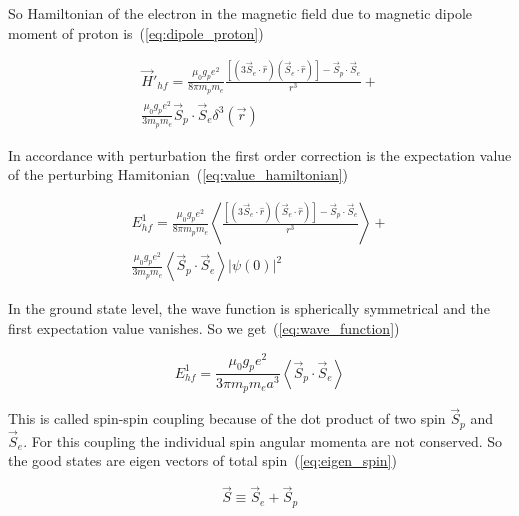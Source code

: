 \documentclass[10pt,conference]{IEEEtran}
\begin{document}
So Hamiltonian of the electron in the magnetic field due to magnetic dipole moment of proton is~(\ref{eq:dipole_proton})

\begin{equation}
\begin{split}
 \vec{H}'_{hf}=\frac{\mathit{\mu}_{0}g_{p}\mathit{e}^{2}}{8\mathit{\pi}\mathit{m}_{p}\mathit{m}_{e}}\frac{[(3\vec{S}_{e}\cdot\mathit{\hat{r}})(\vec{S}_{e}\cdot\mathit{\hat{r}})]-\vec{S}_{p}\cdot\vec{S}_{e}}{\mathit{r}^{3}}+\\\frac{\mathit{\mu}_{0}g_{p}\mathit{e}^{2}}{3\mathit{m}_{p}\mathit{m}_{e}}\vec{S}_{p}\cdot\vec{S}_{e}\delta^{3}(\vec{r})
\end{split}
 \label{eq:dipole_proton}  
\end{equation}

In accordance with perturbation the first order correction is the expectation value of the perturbing Hamitonian~(\ref{eq:value_hamiltonian})

\begin{equation}
\begin{split}
 \mathit{E}_{hf}^{1}=\frac{\mathit{\mu}_{0}g_{p}\mathit{e}^{2}}{8\mathit{\pi}\mathit{m}_{p}\mathit{m}_{e}}\left\langle\frac{[(3\vec{S}_{e}\cdot\mathit{\hat{r}})(\vec{S}_{e}\cdot\mathit{\hat{r}})]-\vec{S}_{p}\cdot\vec{S}_{e}}{\mathit{r}^{3}}\right\rangle+\\\frac{\mathit{\mu}_{0}g_{p}\mathit{e}^{2}}{3\mathit{m}_{p}\mathit{m}_{e}}\left\langle\vec{S}_{p}\cdot\vec{S}_{e}\right\rangle\vert\mathit{\psi}\left(0\right)\vert^{2}
\end{split}
 \label{eq:value_hamiltonian} 
\end{equation}

In the ground state level, the wave function is spherically symmetrical and the first expectation value vanishes. So we get~(\ref{eq:wave_function})

\begin{equation}
 \mathit{E}_{hf}^{1}=\frac{\mathit{\mu}_{0}g_{p}e^{2}}{3\pi\mathit{m}_{p}\mathit{m}_{e}\mathit{a}^{3}}\left\langle\vec{S}_{p}\cdot\vec{S}_{e}\right\rangle
 \label{eq:wave_function}
\end{equation}

This is called spin-spin coupling because of the dot product of two spin $\vec{S}_{p}$ and $\vec{S}_{e}$. For this coupling the individual spin angular momenta are not conserved. So the good states are eigen vectors of total spin~(\ref{eq:eigen_spin})

\begin{equation}
 \vec{S}\equiv\vec{S}_{e}+\vec{S}_{p}
 \label{eq:eigen_spin}
\end{equation}
\end{document}
